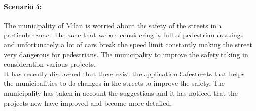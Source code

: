 \documentclass[titlepage]{article}
\begin{document}
\paragraph{Scenario 5:} The municipality of Milan is worried about the safety of the streets in a particular zone. The zone that we are considering is full of pedestrian crossings and unfortunately a lot of cars break  the speed limit constantly making the street very dangerous for pedestrians. The municipality to improve the safety taking in consideration various projects.\\
It has recently discovered that there exist the application Safestreets that helps the municipalities to do changes in the streets to improve the safety. The municipality has taken in account the suggestions and it has noticed that the projects now have improved and become more detailed.
\end{document}

